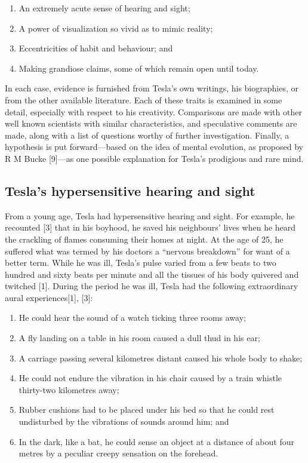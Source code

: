\documentclass[
  11pt,
  a4paper,
]{article}
\providecommand{\tightlist}{%
  \setlength{\itemsep}{0pt}\setlength{\parskip}{0pt}}
\begin{document}
\begin{enumerate}
\tightlist
\item
  An extremely acute sense of hearing and sight;
\item
  A power of visualization so vivid as to mimic reality;
\item
  Eccentricities of habit and behaviour; and
\item
  Making grandiose claims, some of which remain open until today.
\end{enumerate}

In each case, evidence is furnished from Tesla's own writings, his
biographies, or from the other available literature. Each of these
traits is examined in some detail, especially with respect to his
creativity. Comparisons are made with other well known scientists with
similar characteristics, and speculative comments are made, along with a
list of questions worthy of further investigation. Finally, a hypothesis
is put forward---based on the idea of mental evolution, as proposed by R
M Bucke {[}9{]}---as one possible explanation for Tesla's prodigious and
rare mind.

\hypertarget{teslas-hypersensitive-hearing-and-sight}{%
\subsection{Tesla's hypersensitive hearing and
sight}\label{teslas-hypersensitive-hearing-and-sight}}

From a young age, Tesla had hypersensitive hearing and sight. For
example, he recounted {[}3{]} that in his boyhood, he saved his
neighbours' lives when he heard the crackling of flames consuming their
homes at night. At the age of 25, he suffered what was termed by his
doctors a ``nervous breakdown'' for want of a better term. While he was
ill, Tesla's pulse varied from a few beats to two hundred and sixty
beats per minute and all the tissues of his body quivered and twitched
{[}1{]}. During the period he was ill, Tesla had the following
extraordinary aural experiences{[}1{]}, {[}3{]}:

\begin{enumerate}
\item
  He could hear the sound of a watch ticking three rooms away;
\item
  A fly landing on a table in his room caused a dull thud in his ear;
\item
  A carriage passing several kilometres distant caused his whole body to
  shake;
\item
  He could not endure the vibration in his chair caused by a train
  whistle thirty-two kilometres away;
\item
  Rubber cushions had to be placed under his bed so that he could rest
  undisturbed by the vibrations of sounds around him; and
\item
  In the dark, like a bat, he could sense an object at a distance of
  about four metres by a peculiar creepy sensation on the forehead.
\end{enumerate}
\end{document}
